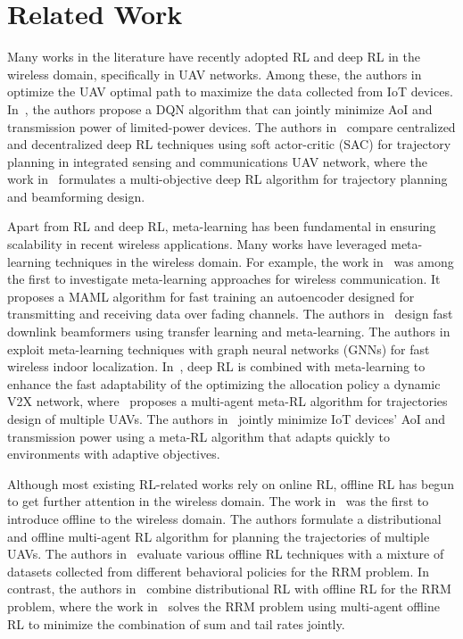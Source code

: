 \section{Related Work}
Many works in the literature have recently adopted RL and deep RL in the wireless domain, specifically in UAV networks. Among these, the authors in~\cite{9701330} optimize the UAV optimal path to maximize the data collected from IoT devices. In~\cite{eldeeb2022multi}, the authors propose a DQN algorithm that can jointly minimize AoI and transmission power of limited-power devices. The authors in~\cite{10086052} compare centralized and decentralized deep RL techniques using soft actor-critic (SAC) for trajectory planning in integrated sensing and communications UAV network, where the work in~\cite{10109153} formulates a multi-objective deep RL algorithm for trajectory planning and beamforming design.

Apart from RL and deep RL, meta-learning has been fundamental in ensuring scalability in recent wireless applications. Many works have leveraged meta-learning techniques in the wireless domain. For example, the work in~\cite{9053252} was among the first to investigate meta-learning approaches for wireless communication. It proposes a MAML algorithm for fast training an autoencoder designed for transmitting and receiving data over fading channels. The authors in~\cite{9257198} design fast downlink beamformers using transfer learning and meta-learning. The authors in~\cite{etiabi2024metagraphlocgraphbasedmetalearningscheme} exploit meta-learning techniques with graph neural networks (GNNs) for fast wireless indoor localization. In~\cite{9495238}, deep RL is combined with meta-learning to enhance the fast adaptability of the optimizing the allocation policy a dynamic V2X network, where~\cite{9457160} proposes a multi-agent meta-RL algorithm for trajectories design of multiple UAVs. The authors in~\cite{sarathchandra2025agepowerminimizationmetadeep} jointly minimize IoT devices' AoI and transmission power using a meta-RL algorithm that adapts quickly to environments with adaptive objectives.


Although most existing RL-related works rely on online RL, offline RL has begun to get further attention in the wireless domain. The work in~\cite{eldeeb2024conser} was the first to introduce offline to the wireless domain. The authors formulate a distributional and offline multi-agent RL algorithm for planning the trajectories of multiple UAVs. The authors in~\cite{10529190} evaluate various offline RL techniques with a mixture of datasets collected from different behavioral policies for the RRM problem. In contrast, the authors in~\cite{eldeeb2024offlinedistributionalreinforcementlearning} combine distributional RL with offline RL for the RRM problem, where the work in~\cite{eldeeb2025offlinemultiagentreinforcementlearning} solves the RRM problem using multi-agent offline RL to minimize the combination of sum and tail rates jointly.